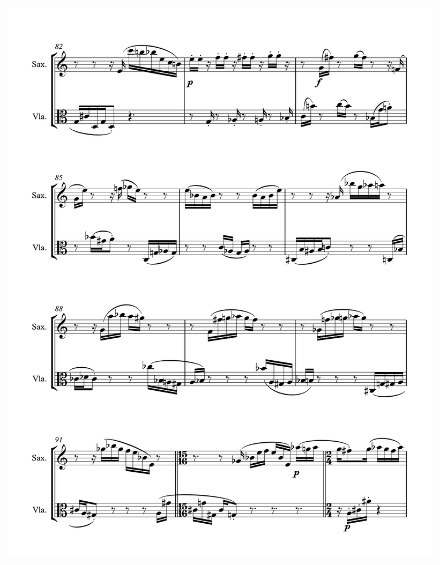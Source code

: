 \begin{figure}[htbp]
    \centering
	\includegraphics[width=6.5in]{figures/Sax_Viola_8.pdf}
\end{figure}

